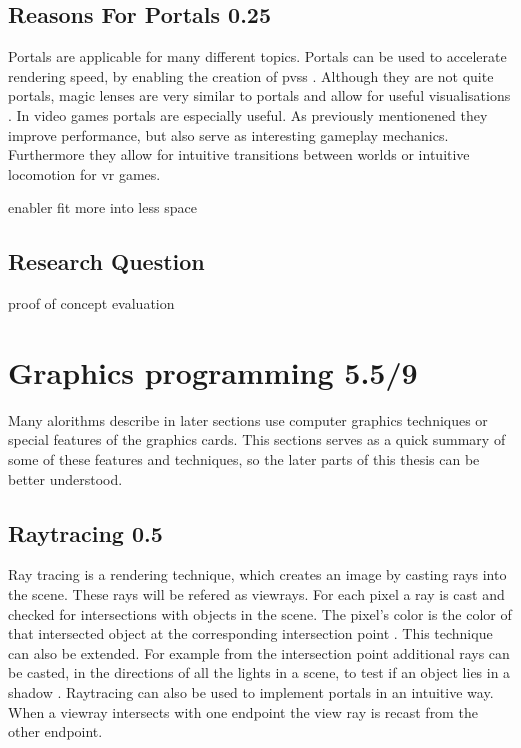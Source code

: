 \subsection{Reasons For Portals 0.25}
Portals are applicable for many different topics. Portals can be used to accelerate rendering speed, by enabling the creation of \glspl{pvs} \cite{luebke:1995:portals}. Although they are not quite portals, magic lenses are very similar to portals and allow for useful visualisations \cite{viega:1996:3d}. In video games portals are especially useful. As previously mentionened they improve performance, but also serve as interesting gameplay mechanics. Furthermore they allow for intuitive transitions between worlds \cite{schmalstieg:1999:sewing} or intuitive locomotion for \gls{vr} games.


enabler fit more into less space

\subsection{Research Question}
proof of concept
evaluation



\section{Graphics programming 5.5/9}


Many alorithms describe in later sections use computer graphics techniques or special features of the graphics cards. This sections serves as a quick summary of some of these features and techniques, so the later parts of this thesis can be better understood. 


\subsection{Raytracing 0.5}
Ray tracing is a rendering technique, which creates an image by casting rays into the scene. These rays will be refered as \glspl{viewray}. For each pixel a ray is cast and checked for intersections with objects in the scene. The pixel's color is the color of that intersected object at the corresponding intersection point \cite{bungartz:2002:einfuhrung}. This technique can also be extended. For example from the intersection point additional rays can be casted, in the directions of all the lights in a scene, to test if an object lies in a shadow \cite{whitted:2005:improved}. Raytracing can also be used to implement portals in an intuitive way. When a \gls{viewray} intersects with one \gls{endpoint} the view ray is recast from the other \gls{endpoint}.

